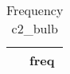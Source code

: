 \begin{table}[htbp]\centering
\def\sym#1{\ifmmode^{#1}\else\(^{#1}\)\fi}
\caption{Frequency c2\_bulb \label{tab:"label"}}
\begin{tabular*}{0.9\hsize}{@{\hskip\tabcolsep\extracolsep\fill}l*{1}{c}}
\toprule
                                &     freq\\
\midrule
\bottomrule
\end{tabular*}
\end{table}
